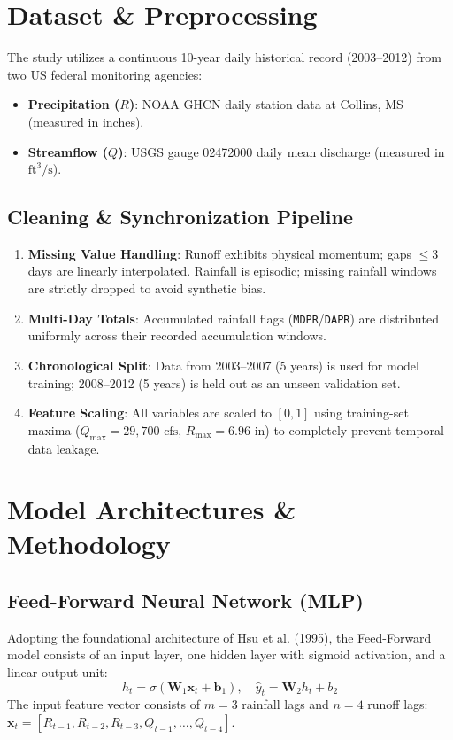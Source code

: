 \documentclass[10pt,twocolumn]{article}
\begin{document}
\section{Dataset \& Preprocessing}
The study utilizes a continuous 10-year daily historical record (2003--2012) from two US federal monitoring agencies:
\begin{itemize}
    \setlength\itemsep{0em}
    \item \textbf{Precipitation ($R$)}: NOAA GHCN daily station data at Collins, MS (measured in inches).
    \item \textbf{Streamflow ($Q$)}: USGS gauge 02472000 daily mean discharge (measured in $\text{ft}^3/\text{s}$).
\end{itemize}

\subsection{Cleaning \& Synchronization Pipeline}
\begin{enumerate}
    \setlength\itemsep{0em}
    \item \textbf{Missing Value Handling}: Runoff exhibits physical momentum; gaps $\le 3$ days are linearly interpolated. Rainfall is episodic; missing rainfall windows are strictly dropped to avoid synthetic bias.
    \item \textbf{Multi-Day Totals}: Accumulated rainfall flags (\texttt{MDPR}/\texttt{DAPR}) are distributed uniformly across their recorded accumulation windows.
    \item \textbf{Chronological Split}: Data from 2003--2007 (5 years) is used for model training; 2008--2012 (5 years) is held out as an unseen validation set.
    \item \textbf{Feature Scaling}: All variables are scaled to $[0, 1]$ using training-set maxima ($Q_{\max} = 29,700\text{ cfs}$, $R_{\max} = 6.96\text{ in}$) to completely prevent temporal data leakage.
\end{enumerate}

\section{Model Architectures \& Methodology}
\subsection{Feed-Forward Neural Network (MLP)}
Adopting the foundational architecture of Hsu et al. (1995), the Feed-Forward model consists of an input layer, one hidden layer with sigmoid activation, and a linear output unit:
\begin{equation}
h_t = \sigma\left(\mathbf{W}_1 \mathbf{x}_t + \mathbf{b}_1\right), \quad \hat{y}_t = \mathbf{W}_2 h_t + b_2
\end{equation}
The input feature vector consists of $m=3$ rainfall lags and $n=4$ runoff lags: $\mathbf{x}_t = [R_{t-1}, R_{t-2}, R_{t-3}, Q_{t-1}, \dots, Q_{t-4}]$.
\end{document}
